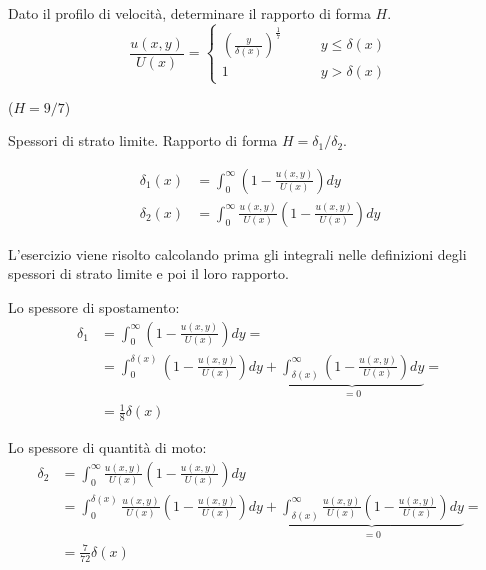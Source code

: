 \noindent
\begin{exerciseS}
Dato il profilo di velocità, determinare il rapporto di forma $H$.
\begin{equation}
  \frac{u(x,y)}{U(x)} = 
  \begin{cases}
    \displaystyle\left( \frac{y}{\delta(x)} \right)^{\frac{1}{7}} &  \qquad y \le \delta(x) \\
    1 &  \qquad y > \delta(x)
  \end{cases}
\end{equation}

($H = 9/7$)
\end{exerciseS}

\sol

\partone Spessori di strato limite. Rapporto di forma $H = \delta_1 / \delta_2$.

\begin{equation}
\begin{aligned}
   \delta_1(x) & = \int_{0}^\infty \displaystyle \left( 1 - \frac{u(x,y)}{U(x)} \right) dy \\
   \delta_2(x) & = \int_{0}^\infty \frac{u(x,y)}{U(x)} \displaystyle \left( 1 - \frac{u(x,y)}{U(x)} \right) dy
\end{aligned}
\end{equation}

\parttwo L'esercizio viene risolto calcolando prima gli integrali nelle definizioni degli spessori di strato limite
e poi il loro rapporto.

Lo spessore di spostamento:
\begin{equation}
\begin{aligned}
  \delta_1 & = \int_{0}^\infty \displaystyle \left( 1 - \frac{u(x,y)}{U(x)} \right) dy  = \\
           & = \int_{0}^{\delta(x)} \displaystyle \left( 1 - \frac{u(x,y)}{U(x)} \right) dy +
           \underbrace{\int_{\delta(x)}^\infty \displaystyle \left( 1 - \frac{u(x,y)}{U(x)} \right) dy}_{=0}  =\\
           & = \frac{1}{8}\delta(x)
\end{aligned}
\end{equation}

Lo spessore di quantità di moto:
\begin{equation}
\begin{aligned}
  \delta_2 & = \int_{0}^\infty \frac{u(x,y)}{U(x)} \displaystyle \left( 1 - \frac{u(x,y)}{U(x)} \right) dy \\
           & = \int_{0}^{\delta(x)} \frac{u(x,y)}{U(x)}\displaystyle \left( 1 - \frac{u(x,y)}{U(x)} \right) dy +
           \underbrace{\int_{\delta(x)}^\infty \frac{u(x,y)}{U(x)}\displaystyle \left( 1 - \frac{u(x,y)}{U(x)} \right) dy}_{=0}  =\\
           & = \frac{7}{72}\delta(x)
\end{aligned}
\end{equation}


